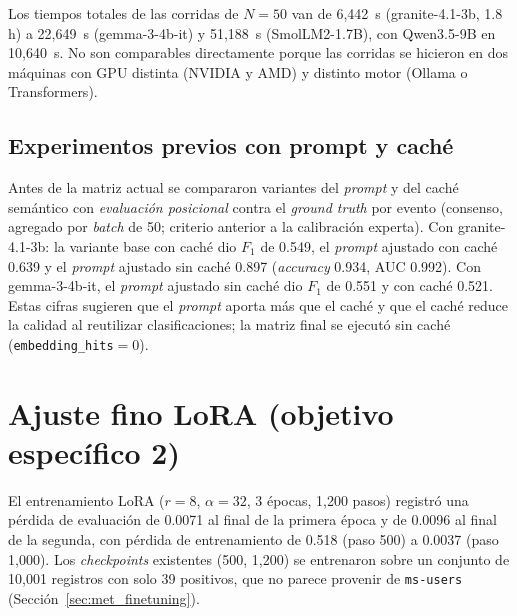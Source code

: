 Los tiempos totales de las corridas de $N=50$ van de 6{,}442~s (granite-4.1-3b, 1.8 h) a 22{,}649~s (gemma-3-4b-it) y 51{,}188~s (SmolLM2-1.7B), con Qwen3.5-9B en 10{,}640~s. No son comparables directamente porque las corridas se hicieron en dos máquinas con GPU distinta (NVIDIA y AMD) y distinto motor (Ollama o Transformers). %

\subsection{Experimentos previos con prompt y caché}\label{sec:res_previos}

Antes de la matriz actual se compararon variantes del \textit{prompt} y del caché semántico con \textit{evaluación posicional} contra el \textit{ground truth} por evento (consenso, agregado por \textit{batch} de 50; criterio anterior a la calibración experta). Con granite-4.1-3b: la variante base con caché dio $F_1$ de 0.549, el \textit{prompt} ajustado con caché 0.639 y el \textit{prompt} ajustado sin caché 0.897 (\textit{accuracy} 0.934, AUC 0.992). Con gemma-3-4b-it, el \textit{prompt} ajustado sin caché dio $F_1$ de 0.551 y con caché 0.521. Estas cifras sugieren que el \textit{prompt} aporta más que el caché y que el caché reduce la calidad al reutilizar clasificaciones; la matriz final se ejecutó sin caché (\texttt{embedding\_hits}$=0$). %

\section{Ajuste fino LoRA (objetivo específico 2)}\label{sec:res_lora}

El entrenamiento LoRA ($r=8$, $\alpha=32$, 3 épocas, 1{,}200 pasos) registró una pérdida de evaluación de 0.0071 al final de la primera época y de 0.0096 al final de la segunda, con pérdida de entrenamiento de 0.518 (paso 500) a 0.0037 (paso 1{,}000). Los \textit{checkpoints} existentes (500, 1{,}200) se entrenaron sobre un conjunto de 10{,}001 registros con solo 39 positivos, que no parece provenir de \texttt{ms-users} (Sección~\ref{sec:met_finetuning}). %

